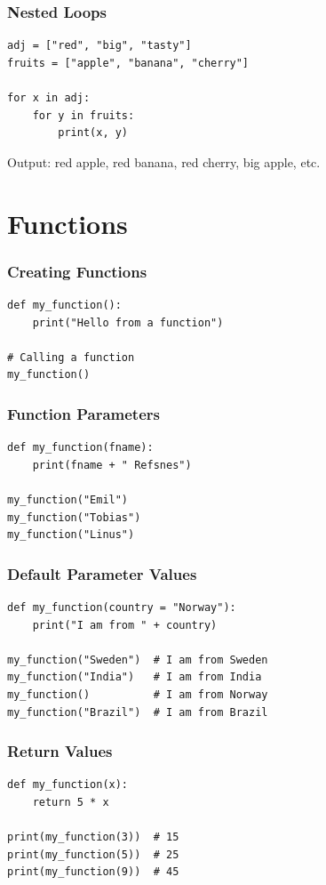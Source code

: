 \documentclass[aspectratio=169]{beamer}
\begin{document}
\begin{frame}[fragile]
\frametitle{Nested Loops}
\begin{lstlisting}
adj = ["red", "big", "tasty"]
fruits = ["apple", "banana", "cherry"]

for x in adj:
    for y in fruits:
        print(x, y)
\end{lstlisting}

Output: red apple, red banana, red cherry, big apple, etc.
\end{frame}

\section{Functions}

\begin{frame}[fragile]
\frametitle{Creating Functions}
\begin{lstlisting}
def my_function():
    print("Hello from a function")

# Calling a function
my_function()
\end{lstlisting}
\end{frame}

\begin{frame}[fragile]
\frametitle{Function Parameters}
\begin{lstlisting}
def my_function(fname):
    print(fname + " Refsnes")

my_function("Emil")
my_function("Tobias")
my_function("Linus")
\end{lstlisting}
\end{frame}

\begin{frame}[fragile]
\frametitle{Default Parameter Values}
\begin{lstlisting}
def my_function(country = "Norway"):
    print("I am from " + country)

my_function("Sweden")  # I am from Sweden
my_function("India")   # I am from India
my_function()          # I am from Norway
my_function("Brazil")  # I am from Brazil
\end{lstlisting}
\end{frame}

\begin{frame}[fragile]
\frametitle{Return Values}
\begin{lstlisting}
def my_function(x):
    return 5 * x

print(my_function(3))  # 15
print(my_function(5))  # 25
print(my_function(9))  # 45
\end{lstlisting}
\end{frame}
\end{document}
